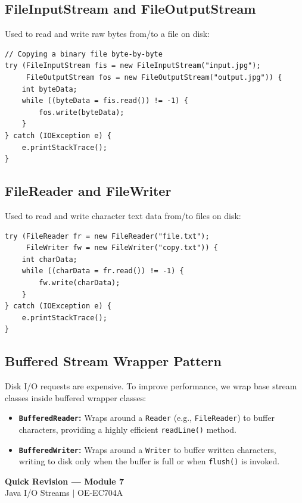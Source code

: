 \documentclass[12pt,a4paper]{article}
\begin{document}
\subsection{FileInputStream and FileOutputStream}
Used to read and write raw bytes from/to a file on disk:
\begin{verbatim}
// Copying a binary file byte-by-byte
try (FileInputStream fis = new FileInputStream("input.jpg");
     FileOutputStream fos = new FileOutputStream("output.jpg")) {
    int byteData;
    while ((byteData = fis.read()) != -1) {
        fos.write(byteData);
    }
} catch (IOException e) {
    e.printStackTrace();
}
\end{verbatim}

\subsection{FileReader and FileWriter}
Used to read and write character text data from/to files on disk:
\begin{verbatim}
try (FileReader fr = new FileReader("file.txt");
     FileWriter fw = new FileWriter("copy.txt")) {
    int charData;
    while ((charData = fr.read()) != -1) {
        fw.write(charData);
    }
} catch (IOException e) {
    e.printStackTrace();
}
\end{verbatim}

\subsection{Buffered Stream Wrapper Pattern}
Disk I/O requests are expensive. To improve performance, we wrap base stream classes inside buffered wrapper classes:
\begin{itemize}[leftmargin=*, itemsep=3.5pt]
  \item \textbf{\texttt{BufferedReader}:} Wraps around a \texttt{Reader} (e.g., \texttt{FileReader}) to buffer characters, providing a highly efficient \texttt{readLine()} method.
  \item \textbf{\texttt{BufferedWriter}:} Wraps around a \texttt{Writer} to buffer written characters, writing to disk only when the buffer is full or when \texttt{flush()} is invoked.
\end{itemize}

\newpage
\begin{center}
  {\large\bfseries\color{myred} Quick Revision --- Module 7}\\[3pt]
  {\small\color{mydark} Java I/O Streams $|$ OE-EC704A}
\end{center}
\noindent{\color{myred}\rule{\linewidth}{1.2pt}}
\vspace{4pt}
\end{document}
